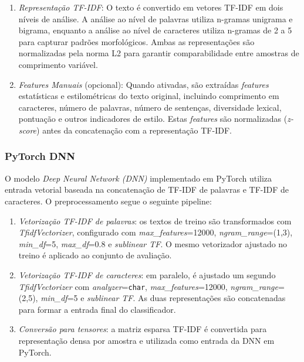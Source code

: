 \documentclass[runningheads]{llncs}
\begin{document}
\begin{enumerate}
    \item \textit{Representação TF-IDF}: O texto é convertido em vetores TF-IDF em dois níveis de análise. A análise ao nível de palavras utiliza n-gramas unigrama e bigrama, enquanto a análise ao nível de caracteres utiliza n-gramas de 2 a 5 para capturar padrões morfológicos. Ambas as representações são normalizadas pela norma L2 para garantir comparabilidade entre amostras de comprimento variável.
    
    \item \textit{\textit{Features} Manuais} (opcional): Quando ativadas, são extraídas \textit{features} estatísticas e estilométricas do texto original, incluindo comprimento em caracteres, número de palavras, número de sentenças, diversidade lexical, pontuação e outros indicadores de estilo. Estas \textit{features} são normalizadas (\textit{z-score}) antes da concatenação com a representação TF-IDF.
\end{enumerate}

\subsubsection{PyTorch DNN}

O modelo \textit{Deep Neural Network (DNN)} implementado em PyTorch utiliza entrada vetorial baseada na concatenação de TF-IDF de palavras e TF-IDF de caracteres. O preprocessamento segue o seguinte pipeline:

\begin{enumerate}
    \item \textit{Vetorização TF-IDF de palavras}: os textos de treino são transformados com \textit{TfidfVectorizer}, configurado com \textit{max\_features}=12000, \textit{ngram\_range}=(1,3), \textit{min\_df}=5, \textit{max\_df}=0.8 e \textit{sublinear TF}. O mesmo vetorizador ajustado no treino é aplicado ao conjunto de avaliação.
    
    \item \textit{Vetorização TF-IDF de caracteres}: em paralelo, é ajustado um segundo \textit{TfidfVectorizer} com \textit{analyzer}=\texttt{char}, \textit{max\_features}=12000, \textit{ngram\_range}=(2,5), \textit{min\_df}=5 e \textit{sublinear TF}. As duas representações são concatenadas para formar a entrada final do classificador.
    
    \item \textit{Conversão para tensores}: a matriz esparsa TF-IDF é convertida para representação densa por amostra e utilizada como entrada da DNN em PyTorch.
\end{enumerate}
\end{document}
